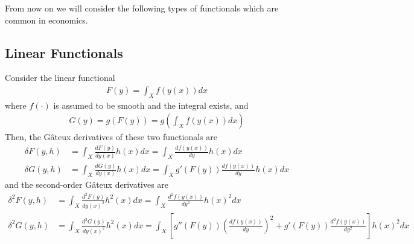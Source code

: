 \documentclass[11pt]{elegantbook}
\begin{document}
From now on we will consider the following types of functionals which are common in economics.

\subsection{Linear Functionals}
Consider the linear functional
\begin{equation}
    \begin{aligned}
        F(y)=\int_X f(y(x))dx
    \end{aligned}
    \nonumber
\end{equation}
where $f(\cdot)$ is assumed to be smooth and the integral exists, and
\begin{equation}
    \begin{aligned}
        G(y)=g(F(y))=g\left(\int_X f(y(x))dx\right)
    \end{aligned}
    \nonumber
\end{equation}
Then, the Gâteux derivatives of these two functionals are
\begin{equation}
    \begin{aligned}
        \delta F(y,h)&=\int_X\frac{d F(y)}{d y(x)}h(x) dx=\int_X\frac{d f(y(x))}{d y}h(x) dx\\
        \delta G(y,h)&=\int_X\frac{d G(y)}{d y(x)}h(x) dx=\int_Xg'(F(y))\frac{d f(y(x))}{d y}h(x) dx
    \end{aligned}
    \nonumber
\end{equation}
and the second-order Gâteux derivatives are
\begin{equation}
    \begin{aligned}
        \delta^2 F(y,h)&=\int_X\frac{d^2 F(y)}{d y(x)^2}h^2(x) dx=\int_X\frac{d^2 f(y(x))}{d y^2}h(x)^2 dx\\
        \delta^2 G(y,h)&=\int_X\frac{d^2 G(y)}{d y(x)^2}h^2(x) dx=\int_X\left[g''(F(y))\left(\frac{d f(y(x))}{d y}\right)^2+g'(F(y))\frac{d^2 f(y(x))}{d y^2}\right]h(x)^2 dx
    \end{aligned}
    \nonumber
\end{equation}
\end{document}
